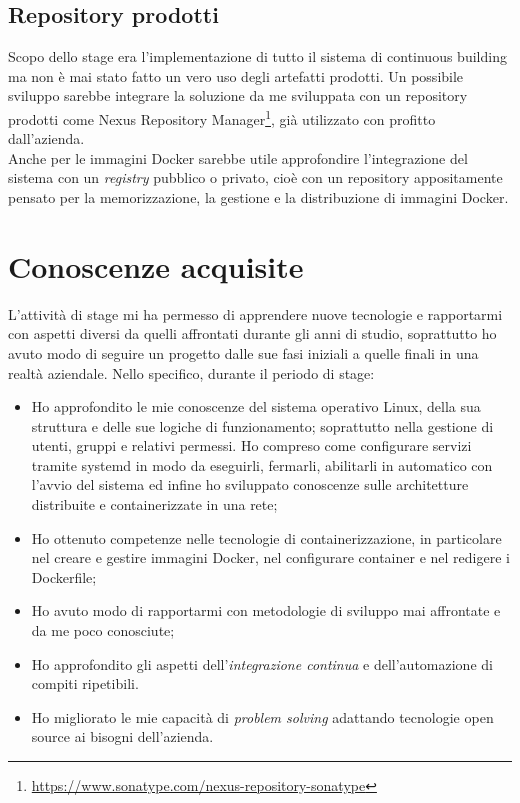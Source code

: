 \subsection{Repository prodotti}

Scopo dello stage era l'implementazione di tutto il sistema di \gls{continuous building} ma non è mai stato fatto un vero uso degli artefatti prodotti. Un possibile sviluppo sarebbe integrare la soluzione da me sviluppata con un \gls{repository} prodotti come Nexus Repository Manager\footnote{\url{https://www.sonatype.com/nexus-repository-sonatype}}, già utilizzato con profitto dall'azienda.\\

Anche per le immagini Docker sarebbe utile approfondire l'integrazione del sistema con un \textit{registry} pubblico o privato, cioè con un repository appositamente pensato per la memorizzazione, la gestione e la distribuzione di immagini Docker.

\section{Conoscenze acquisite}

L'attività di stage mi ha permesso di apprendere nuove tecnologie e rapportarmi con aspetti diversi da quelli affrontati durante gli anni di studio, soprattutto ho avuto modo di seguire un progetto dalle sue fasi iniziali a quelle finali in una realtà aziendale. Nello specifico, durante il periodo di stage:

\begin{itemize}
    \item Ho approfondito le mie conoscenze del sistema operativo \gls{Linux}, della sua struttura e delle sue logiche di funzionamento; soprattutto nella gestione di utenti, gruppi e relativi permessi. Ho compreso come configurare servizi tramite \gls{systemd} in modo da eseguirli, fermarli, abilitarli in automatico con l'avvio del sistema ed infine ho sviluppato conoscenze sulle architetture distribuite e containerizzate in una rete\cite{site:docker-networking}; 
    \item Ho ottenuto competenze nelle tecnologie di containerizzazione, in particolare nel creare e gestire immagini Docker, nel configurare container e nel redigere i Dockerfile;
    \item Ho avuto modo di rapportarmi con metodologie di sviluppo mai affrontate e da me poco conosciute;
    \item Ho approfondito gli aspetti dell'\textit{integrazione continua} e dell'automazione di compiti ripetibili.
    \item Ho migliorato le mie capacità di \textit{problem solving} adattando tecnologie open source ai bisogni dell'azienda.
\end{itemize}

